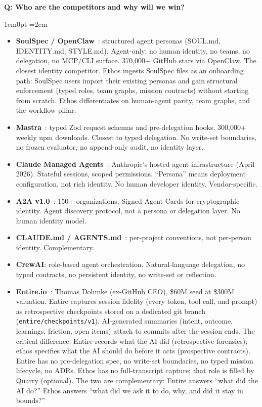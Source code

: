 \documentclass[11pt,letterpaper]{article}
\newcounter{faqnum}
\newenvironment{faqpair}[1]{%
  \needspace{4\baselineskip}%
  \vspace{0.5em}%
  \refstepcounter{faqnum}%
  \noindent\textbf{\color{SectionBlue}Q\thefaqnum: #1}\par\nopagebreak[4]%
  \vspace{0.2em}%
  \begin{adjustwidth}{1em}{0pt}%
  \setlength{\parindent}{0pt}%
  \emergencystretch=2em%
}{%
  \end{adjustwidth}%
  \vspace{0.5em}%
}
\begin{document}
\begin{faqpair}{Who are the competitors and why will we win?}\label{faq:competitors}
\begin{itemize}[nosep]
  \item \textbf{SoulSpec / OpenClaw}~\cite{soulspec2026standard,arxiv2510soulmd}: structured agent personas (SOUL.md, IDENTITY.md, STYLE.md). Agent-only; no human identity, no teams, no delegation, no MCP/CLI surface. 370,000+ GitHub stars via OpenClaw. The closest identity competitor. Ethos ingests SoulSpec files as an onboarding path: SoulSpec users import their existing personas and gain structural enforcement (typed roles, team graphs, mission contracts) without starting from scratch. Ethos differentiates on human-agent parity, team graphs, and the workflow pillar.
  \item \textbf{Mastra}~\cite{mastra2026supervisor}: typed Zod request schemas and pre-delegation hooks. 300,000+ weekly npm downloads. Closest to typed delegation. No write-set boundaries, no frozen evaluator, no append-only audit, no identity layer.
  \item \textbf{Claude Managed Agents}~\cite{claudemanagedagents2026}: Anthropic's hosted agent infrastructure (April 2026). Stateful sessions, scoped permissions. ``Persona'' means deployment configuration, not rich identity. No human developer identity. Vendor-specific.
  \item \textbf{A2A v1.0}~\cite{a2av1milestone2026}: 150+ organizations, Signed Agent Cards for cryptographic identity. Agent discovery protocol, not a persona or delegation layer. No human identity model.
  \item \textbf{CLAUDE.md / AGENTS.md}~\cite{claudemd2025pnote}: per-project conventions, not per-person identity. Complementary.
  \item \textbf{CrewAI}: role-based agent orchestration. Natural-language delegation, no typed contracts, no persistent identity, no write-set or reflection.
  \item \textbf{Entire.io}~\cite{entire2026techcrunch,entireio2026docs,entireio2026hello}: Thomas Dohmke (ex-GitHub CEO), \$60M seed at \$300M valuation. Entire captures session fidelity (every token, tool call, and prompt) as retrospective checkpoints stored on a dedicated git branch ({\small\texttt{entire/checkpoints/v1}}). AI-generated summaries (intent, outcome, learnings, friction, open items) attach to commits after the session ends. The critical difference: Entire records what the AI did (retrospective forensics); ethos specifies what the AI should do before it acts (prospective contracts). Entire has no pre-delegation spec, no write-set boundaries, no typed mission lifecycle, no ADRs. Ethos has no full-transcript capture; that role is filled by Quarry (optional). The two are complementary: Entire answers ``what did the AI do?'' Ethos answers ``what did we ask it to do, why, and did it stay in bounds?''

\end{itemize}
\end{faqpair}
\end{document}

